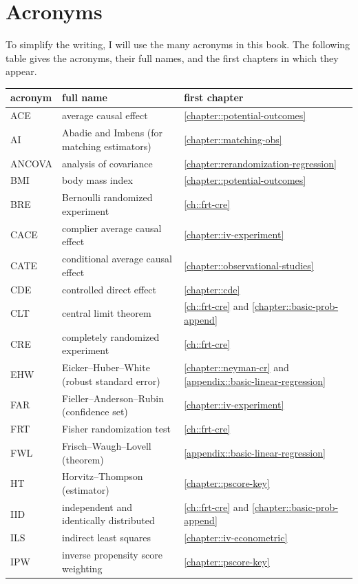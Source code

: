 \chapter*{Acronyms}


To simplify the writing, I will use the many acronyms in this book. The following table gives the acronyms, their full names, and the first chapters in which they  appear.

\begin{tabular}{lll}
\hline 
acronym & full name & first chapter \\
\hline 
ACE& average causal effect&  \ref{chapter::potential-outcomes} \\
AI & Abadie and Imbens (for matching estimators) & \ref{chapter::matching-obs} \\
ANCOVA & analysis of covariance & \ref{chapter:rerandomization-regression}\\
BMI & body mass index & \ref{chapter::potential-outcomes} \\
BRE & Bernoulli randomized experiment & \ref{ch::frt-cre}\\
CACE & complier average causal effect & \ref{chapter::iv-experiment} \\
CATE & conditional average causal effect & \ref{chapter::observational-studies}\\
CDE & controlled direct effect & \ref{chapter::cde} \\
CLT & central limit theorem & \ref{ch::frt-cre} and \ref{chapter::basic-prob-append} \\
CRE & completely randomized experiment & \ref{ch::frt-cre} \\
EHW& Eicker--Huber--White (robust standard error) & \ref{chapter::neyman-cr} and \ref{appendix::basic-linear-regression}\\
FAR & Fieller--Anderson--Rubin (confidence set) & \ref{chapter::iv-experiment}\\
FRT & Fisher randomization test & \ref{ch::frt-cre} \\
FWL & Frisch--Waugh--Lovell (theorem) & \ref{appendix::basic-linear-regression} \\
HT& Horvitz--Thompson (estimator) & \ref{chapter::pscore-key}\\
  IID & independent and identically distributed &  \ref{ch::frt-cre} and \ref{chapter::basic-prob-append} \\
  ILS & indirect least squares & \ref{chapter::iv-econometric} \\
   IPW& inverse propensity score weighting & \ref{chapter::pscore-key}\\

\end{tabular}
